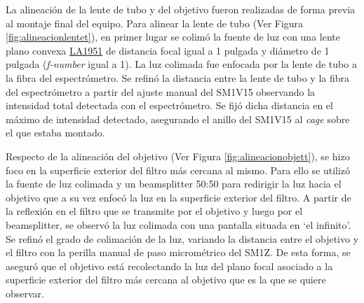La alineación de la lente de tubo y del objetivo fueron realizadas de forma previa al montaje final del equipo. Para alinear la lente de tubo (Ver Figura \ref{fig:alineacionlentet}), en primer lugar se colimó la fuente de luz con una lente plano convexa \href{https://www.thorlabs.com/thorproduct.cfm?partnumber=LA1951}{LA1951} de distancia focal igual a 1 pulgada y diámetro de 1 pulgada (\textit{f-number} igual a 1). La luz colimada fue enfocada por la lente de tubo a la fibra del espectrómetro. Se refinó la distancia entre la lente de tubo y la fibra del espectrómetro a partir del ajuste manual del SM1V15 observando la intensidad total detectada con el espectrómetro. Se fijó dicha distancia en el máximo de intensidad detectado, asegurando el anillo del SM1V15 al \textit{cage} sobre el que estaba montado.

Respecto de la alineación del objetivo (Ver Figura \ref{fig:alineacionobjett}), se hizo foco en la superficie exterior del filtro más cercana al mismo. Para ello se utilizó la fuente de luz colimada y un beamsplitter 50:50 para redirigir la luz hacia el objetivo que a su vez enfocó la luz en la superficie exterior del filtro. A partir de la reflexión en el filtro que se transmite por el objetivo y luego por el beamsplitter, se observó la luz colimada con una pantalla situada en `el infinito'.  Se refinó el grado de colimación de la luz, variando la distancia entre el objetivo y el filtro con la perilla manual de paso micrométrico del SM1Z. De esta forma, se aseguró que el objetivo está recolectando la luz del plano focal asociado a la superficie exterior del filtro más cercana al objetivo que es la que se quiere observar. 
